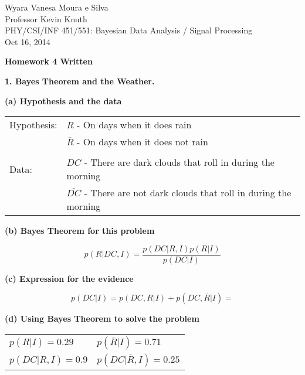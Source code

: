 \documentclass[a4paper, 12pt]{article}
\begin{document}
\begin{flushleft}

Wyara Vanesa Moura e Silva\\
Professor Kevin Knuth \\
PHY/CSI/INF 451/551: Bayesian Data Analysis / Signal Processing \\
Oct 16, 2014\\

\begin{center}
\textbf{Homework 4 Written}
\end{center}


\setlength{\parindent}{0.5in}

\textbf{1. Bayes Theorem and the Weather.}

\textbf{(a) Hypothesis and the data } 

\begin{table}[ht]
    \centering
    \begin{tabular}{l l}
        Hypothesis: & $R$ - On days when it does rain  \\
                    & $\overline{R}$ - On days when it does not rain\\
										& \\
        Data:       & $DC$ - There are dark clouds that roll in during the morning \\
                    & $\overline{DC}$ - There are not dark clouds that roll in during the morning \\
    \end{tabular}
    \label{tab:hypdata}
\end{table}


\textbf{(b) Bayes Theorem for this problem} 

$$ p(R | DC, I) = \frac{p(DC | R, I)p(R | I)}{p(DC|I)} $$

\textbf{(c) Expression for the evidence}

$$ p(DC | I) = p(DC, R | I) + p(DC, \overline{R} | I) = $$


\textbf{(d) Using Bayes Theorem to solve the problem} 

\begin{table}[ht]
    \centering
    \begin{tabular}{l l}
        $ p(R | I) = 0.29 $    & $ p(\overline{R} | I) = 0.71 $ \\
        $ p(DC | R, I) = 0.9 $ &  $ p(DC | \overline{R}, I) = 0.25 $ \\
    \end{tabular}
\end{table}


\end{flushleft}
\end{document}
